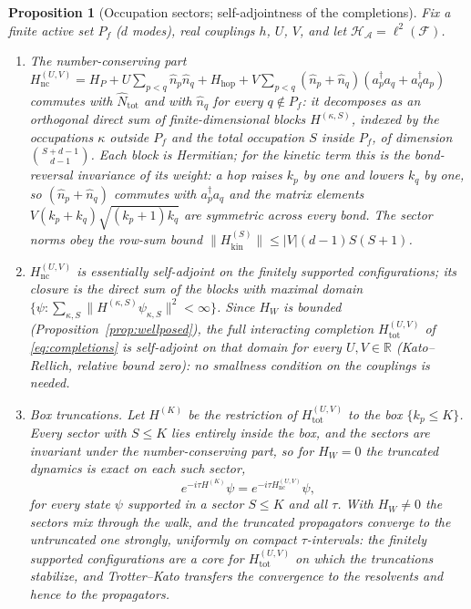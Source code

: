 \documentclass[11pt,a4paper]{article}
\theoremstyle{plain}
\newtheorem{proposition}[theorem]{Proposition}
\theoremstyle{definition}
\theoremstyle{remark}
\newcommand{\Rr}{\mathbb{R}}
\newcommand{\Hil}{\mathcal{H}}
\newcommand{\Nhat}{\widehat{N}}
\begin{document}
\begin{proposition}[Occupation sectors; self-adjointness of the completions]\label{prop:sector}
Fix a finite active set $P_{f}$ ($d$ modes), real couplings $h$, $U$, $V$, and let
$\Hil_{\mathcal{A}}=\ell^{2}(\mathcal{F})$.
\begin{enumerate}[leftmargin=1.6em]
\item The number-conserving part
$H_{\mathrm{nc}}^{(U,V)}=H_{P}+U\sum_{p<q}\hat n_{p}\hat n_{q}+H_{\mathrm{hop}}+V\sum_{p<q}
(\hat n_{p}+\hat n_{q})(a_{p}^{\dagger}a_{q}+a_{q}^{\dagger}a_{p})$
commutes with $\Nhat_{\mathrm{tot}}$ and with $\hat n_{q}$ for every $q\notin P_{f}$: it
decomposes as an orthogonal direct sum of finite-dimensional blocks $H^{(\kappa,S)}$, indexed
by the occupations $\kappa$ outside $P_{f}$ and the total occupation $S$ inside $P_{f}$, of
dimension $\binom{S+d-1}{d-1}$. Each block is Hermitian; for the kinetic term this is the
bond-reversal invariance of its weight: a hop raises $k_{p}$ by one and lowers $k_{q}$ by
one, so $(\hat n_{p}+\hat n_{q})$ commutes with $a_{p}^{\dagger}a_{q}$ and the matrix
elements $V(k_{p}+k_{q})\sqrt{(k_{p}+1)k_{q}}$ are symmetric across every bond. The sector
norms obey the row-sum bound
$\|H_{\mathrm{kin}}^{(S)}\|\leq|V|(d-1)S(S+1)$.
\item $H_{\mathrm{nc}}^{(U,V)}$ is essentially self-adjoint on the finitely supported
configurations; its closure is the direct sum of the blocks with maximal domain
$\{\psi:\sum_{\kappa,S}\|H^{(\kappa,S)}\psi_{\kappa,S}\|^{2}<\infty\}$. Since $H_{W}$ is
bounded (Proposition~\ref{prop:wellposed}), the full interacting completion
$H_{\mathrm{tot}}^{(U,V)}$ of \eqref{eq:completions} is self-adjoint on that domain for
every $U,V\in\Rr$ (Kato--Rellich, relative bound zero): no smallness condition on the
couplings is needed.
\item \emph{Box truncations.} Let $H^{(K)}$ be the restriction of
$H_{\mathrm{tot}}^{(U,V)}$ to the box $\{k_{p}\leq K\}$. Every sector with $S\leq K$ lies
entirely inside the box, and the sectors are invariant under the number-conserving part, so
for $H_{W}=0$ the truncated dynamics is \emph{exact} on each such sector,
\begin{equation*}
e^{-i\tau H^{(K)}}\psi=e^{-i\tau H_{\mathrm{nc}}^{(U,V)}}\psi ,
\end{equation*}
for every state $\psi$
supported in a sector $S\leq K$ and all $\tau$. With $H_{W}\neq0$ the sectors mix through the
walk, and the truncated propagators converge to the untruncated one strongly, uniformly on
compact $\tau$-intervals: the finitely supported configurations are a core for
$H_{\mathrm{tot}}^{(U,V)}$ on which the truncations stabilize, and Trotter--Kato transfers
the convergence to the resolvents and hence to the propagators.
\end{enumerate}
\end{proposition}
\end{document}

